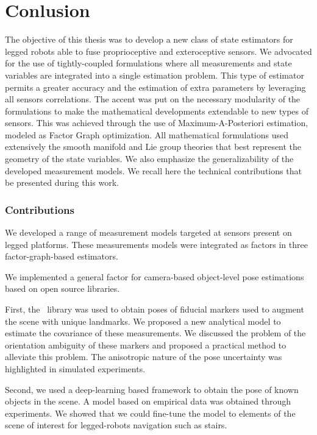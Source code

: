 \part{Conlusion}

The objective of this thesis was to develop a new class of state estimators for legged robots able to fuse proprioceptive and exteroceptive
sensors. We advocated for the use of tightly-coupled formulations where all measurements and state variables are integrated into a single estimation 
problem. This type of estimator permits a greater accuracy and the estimation of extra parameters by leveraging all sensors correlations.
The accent was put on the necessary modularity of the formulations to make the mathematical developments extendable to new types of sensors. This 
was achieved through the use of Maximum-A-Posteriori estimation, modeled as Factor Graph optimization. All mathematical formulations used extensively the smooth manifold
and Lie group theories that best represent the geometry of the state variables. We also emphasize the generalizability of the developed measurement models. 
We recall here the technical contributions that be presented during this work.

\section{Contributions}

We developed a range of measurement models targeted at sensors present on legged platforms. These measurements models were integrated as factors in 
three factor-graph-based estimators.

\bigskip

We implemented a general factor for camera-based object-level pose estimations based on open source libraries. 

First, the \apriltag\ library was used 
to obtain poses of fiducial markers used to augment the scene with unique landmarks. We proposed a new analytical model to estimate the covariance of 
these measurements. We discussed the problem of the orientation ambiguity of these markers and proposed a practical method to alleviate this problem.
The anisotropic nature of the pose uncertainty was highlighted in simulated experiments. 

Second, we used a deep-learning based framework to obtain the pose of known objects in the scene. A model based on empirical data was obtained through
experiments. We showed that we could fine-tune the model to elements of the scene of interest for legged-robots navigation such as stairs.

